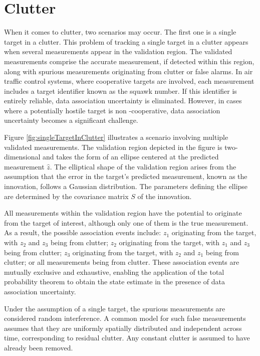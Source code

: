 \section{Clutter}
When it comes to clutter, two scenarios may occur. The first one is a single target in a clutter. This problem of
tracking a single target in a clutter appears when several measurements appear in the validation region. The
validated measurements comprise the accurate measurement, if detected within this region, along with spurious
measurements originating from clutter or false alarms. In air traffic control systems, where cooperative targets are
involved, each measurement includes a target identifier known as the squawk number. If this identifier is entirely
reliable, data association uncertainty is eliminated. However, in cases where a potentially hostile target is non
-cooperative, data association uncertainty becomes a significant challenge.

Figure \eqref{fig:singleTargetInClutter} illustrates a scenario involving multiple validated measurements. The validation region depicted in the
figure is two-dimensional and takes the form of an ellipse centered at the predicted measurement $\hat{z}$. The
elliptical shape of the validation region arises from the assumption that the error in the target's predicted
measurement, known as the innovation, follows a Gaussian distribution. The parameters defining the ellipse are
determined by the covariance matrix $S$ of the innovation.

All measurements within the validation region have the potential to originate from the target of interest, although
only one of them is the true measurement. As a result, the possible association events include: $z_1$ originating
from the target, with $z_2$ and $z_3$ being from clutter; $z_2$ originating from the target, with $z_1$ and $z_3$
being from clutter; $z_3$ originating from the target, with $z_2$ and $z_1$ being from clutter; or all measurements
being from clutter. These association events are mutually exclusive and exhaustive, enabling the application of the
total probability theorem to obtain the state estimate in the presence of data association uncertainty.

Under the assumption of a single target, the spurious measurements are considered random interference. A common model for such false measurements assumes that they are uniformly spatially distributed and independent across time, corresponding to residual clutter. Any constant clutter is assumed to have already been removed.

